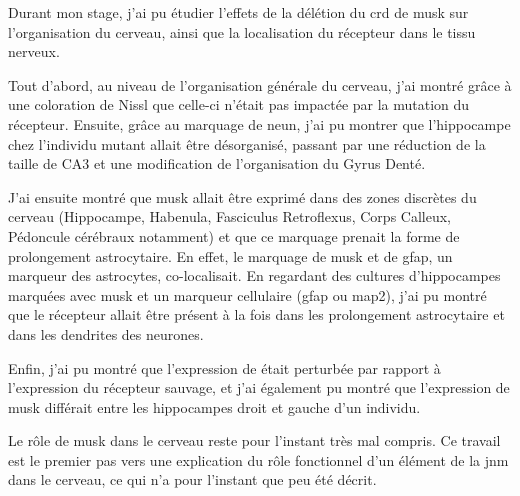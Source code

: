 	Durant mon stage, j'ai pu étudier l'effets de la délétion du \gls{crd} de \gls{musk} sur l'organisation du cerveau, ainsi que la localisation du récepteur dans le tissu nerveux.
	
	Tout d'abord, au niveau de l'organisation générale du cerveau, j'ai montré grâce à une coloration de Nissl que celle-ci n'était pas impactée par la mutation du récepteur. Ensuite, grâce au marquage de \gls{neun}, j'ai pu montrer que l'hippocampe chez l'individu mutant allait être désorganisé, passant par une réduction de la taille de CA3 et une modification de l'organisation du Gyrus Denté.
	
	J'ai ensuite montré que \gls{musk} allait être exprimé dans des zones discrètes du cerveau (Hippocampe, Habenula, Fasciculus Retroflexus, Corps Calleux, Pédoncule cérébraux notamment) et que ce marquage prenait la forme de prolongement astrocytaire. En effet, le marquage de \gls{musk} et de \gls{gfap}, un marqueur des astrocytes, co-localisait. En regardant des cultures d'hippocampes marquées avec \gls{musk} et un marqueur cellulaire (\gls{gfap} ou \gls{map2}), j'ai pu montré que le récepteur allait être présent à la fois dans les prolongement astrocytaire et dans les dendrites des neurones.
	
	Enfin, j'ai pu montré que l'expression de \mcrd était perturbée par rapport à l'expression du récepteur sauvage, et j'ai également pu montré que l'expression de \gls{musk} différait entre les hippocampes droit et gauche d'un individu.
	
	Le rôle de \gls{musk} dans le cerveau reste pour l'instant très mal compris. Ce travail est le premier pas vers une explication du rôle fonctionnel d'un élément de la \gls{jnm} dans le cerveau, ce qui n'a pour l'instant que peu été décrit.
	